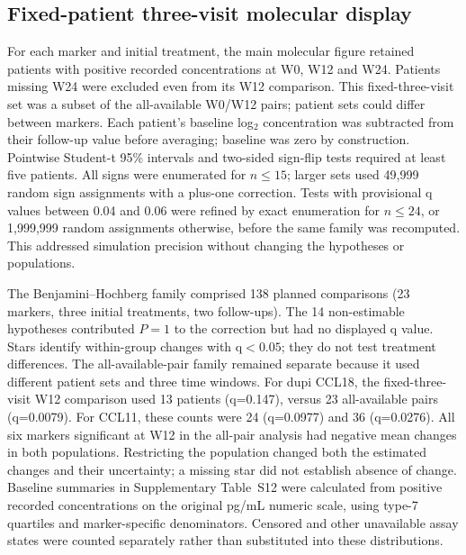 \subsection{Fixed-patient three-visit molecular display}
For each marker and initial treatment, the main molecular figure retained patients with positive recorded concentrations at W0, W12 and W24. Patients missing W24 were excluded even from its W12 comparison. This fixed-three-visit set was a subset of the all-available W0/W12 pairs; patient sets could differ between markers. Each patient's baseline log$_2$ concentration was subtracted from their follow-up value before averaging; baseline was zero by construction. Pointwise Student-t 95\% intervals and two-sided sign-flip tests required at least five patients. All signs were enumerated for $n\leq15$; larger sets used 49,999 random sign assignments with a plus-one correction. Tests with provisional q values between 0.04 and 0.06 were refined by exact enumeration for $n\leq24$, or 1,999,999 random assignments otherwise, before the same family was recomputed. This addressed simulation precision without changing the hypotheses or populations.

The Benjamini--Hochberg family comprised 138 planned comparisons (23 markers, three initial treatments, two follow-ups). The 14 non-estimable hypotheses contributed $P=1$ to the correction but had no displayed q value. Stars identify within-group changes with q$<0.05$; they do not test treatment differences. The all-available-pair family remained separate because it used different patient sets and three time windows. For dupi CCL18, the fixed-three-visit W12 comparison used 13 patients (q=0.147), versus 23 all-available pairs (q=0.0079). For CCL11, these counts were 24 (q=0.0977) and 36 (q=0.0276). All six markers significant at W12 in the all-pair analysis had negative mean changes in both populations. Restricting the population changed both the estimated changes and their uncertainty; a missing star did not establish absence of change. Baseline summaries in Supplementary Table~S12 were calculated from positive recorded concentrations on the original pg/mL numeric scale, using type-7 quartiles and marker-specific denominators. Censored and other unavailable assay states were counted separately rather than substituted into these distributions.

